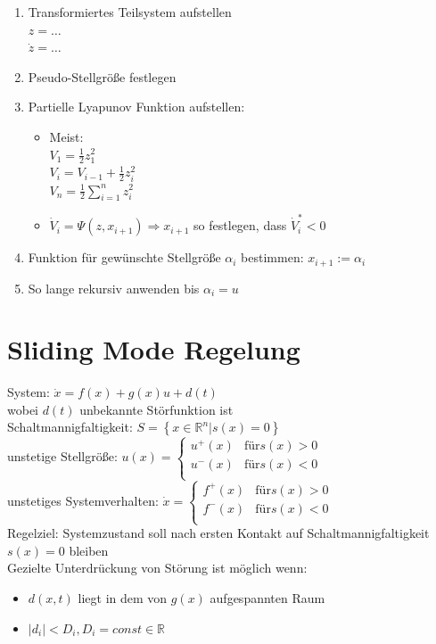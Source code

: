 \documentclass[german]{latex4ei/latex4ei_sheet}
\begin{document}
\begin{enumerate}
  \item Transformiertes Teilsystem aufstellen\\
    $z = \dots$\\
    $\dot{z} = \dots$
  \item Pseudo-Stellgröße festlegen
  \item Partielle Lyapunov Funktion aufstellen:
    \begin{itemize}
      \item  Meist:\\
        $V_1 = \frac{1}{2} z_1^2$\\
        $V_i = V_{i-1} + \frac{1}{2}z_i^2$ \\
        $V_n = \frac{1}{2} \sum\limits_{i=1}^{n} z_i^2$
      \item $\dot{V}_i = \Psi(z, x_{i+1}) \Rightarrow x_{i+1}$ so festlegen, dass $\dot{V}_i^* < 0$
    \end{itemize}
  \item Funktion für gewünschte Stellgröße $\alpha_i$ bestimmen: $x_{i+1} := \alpha_i$
  \item So lange rekursiv anwenden bis $\alpha_i = u$
\end{enumerate}



\section{Sliding Mode Regelung}

System: $\dot{x} = f(x) + g(x)u + d(t)$ \\
wobei $d(t)$ unbekannte Störfunktion ist \\
Schaltmannigfaltigkeit: $S = \left\{ x \in \mathbb{R}^n | s(x) = 0 \right\}$ \\
unstetige Stellgröße:
$u(x) =
\begin{cases}
  u^+(x) & \text{für} s(x) > 0 \\
  u^-(x) & \text{für} s(x) < 0 \\
\end{cases}$\\
unstetiges Systemverhalten:
$\dot{x} =
\begin{cases}
  f^+(x) & \text{für} s(x) > 0 \\
  f^-(x) & \text{für} s(x) < 0 \\
\end{cases}$\\
Regelziel: Systemzustand soll nach ersten Kontakt auf Schaltmannigfaltigkeit $s(x) = 0$ bleiben\\
Gezielte Unterdrückung von Störung ist möglich wenn:
\begin{itemize}
  \item $d(x,t)$ liegt in dem von $g(x)$ aufgespannten Raum
  \item $|d_i| < D_i, D_i = const \in \mathbb{R}$
\end{itemize}
\end{document}
